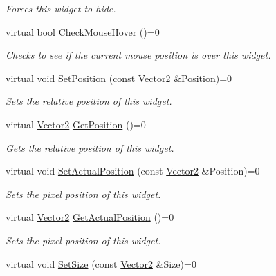 \begin{DoxyCompactItemize}
\begin{DoxyCompactList}\small\item\em Forces this widget to hide. \item\end{DoxyCompactList}\item 
virtual bool \hyperlink{classphys_1_1UI_1_1Cell_aff6472ccb5d6d7bd3e7d3a967c67674d}{CheckMouseHover} ()=0
\begin{DoxyCompactList}\small\item\em Checks to see if the current mouse position is over this widget. \item\end{DoxyCompactList}\item 
virtual void \hyperlink{classphys_1_1UI_1_1Cell_af43b353b0033d3605dad04e925363f2b}{SetPosition} (const \hyperlink{classphys_1_1Vector2}{Vector2} \&Position)=0
\begin{DoxyCompactList}\small\item\em Sets the relative position of this widget. \item\end{DoxyCompactList}\item 
virtual \hyperlink{classphys_1_1Vector2}{Vector2} \hyperlink{classphys_1_1UI_1_1Cell_a17475dbdde2d71be3d774f0402792f0d}{GetPosition} ()=0
\begin{DoxyCompactList}\small\item\em Gets the relative position of this widget. \item\end{DoxyCompactList}\item 
virtual void \hyperlink{classphys_1_1UI_1_1Cell_ae8b1850754b6b9ea48636b619dada5ea}{SetActualPosition} (const \hyperlink{classphys_1_1Vector2}{Vector2} \&Position)=0
\begin{DoxyCompactList}\small\item\em Sets the pixel position of this widget. \item\end{DoxyCompactList}\item 
virtual \hyperlink{classphys_1_1Vector2}{Vector2} \hyperlink{classphys_1_1UI_1_1Cell_a1b0deb9738bc4da73e0be4dd355b23fb}{GetActualPosition} ()=0
\begin{DoxyCompactList}\small\item\em Sets the pixel position of this widget. \item\end{DoxyCompactList}\item 
virtual void \hyperlink{classphys_1_1UI_1_1Cell_a59075a5ae35c2080876fcc78a97e5b31}{SetSize} (const \hyperlink{classphys_1_1Vector2}{Vector2} \&Size)=0

\end{DoxyCompactItemize}
